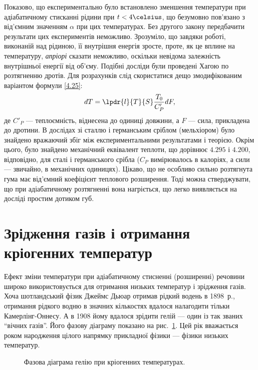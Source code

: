 Показово, що експериментально було встановлено зменшення температури при адіабатичному стисканні
рідини при $t<4\celsius$, що безумовно пов'язано з від'ємним значенням $\alpha$ при цих температурах.
Без другого закону передбачити результати цих експериментів неможливо. Зрозуміло, що завдяки роботі,
виконаній над рідиною, її внутрішня енергія зросте, проте, як це вплине на температуру, \emph{апріорі}
сказати неможливо, оскільки невідома залежність внутрішньої енергії від об'єму. Подібні досліди були
проведені Хагою по розтягненню дротів. Для розрахунків слід скористатися дещо змодифікованим варіантом
формули \eqref{4.25}:
\begin{equation}\label{4.27}
	dT = \lpdr{l}{T}{S}\dfrac{T_0}{C'_P}dF,
\end{equation}
де $C'_P$ --- теплоємність, віднесена до одиниці довжини, а $F$ --- сила, прикладена до дротини. В
дослідах зі сталлю і германським сріблом (мельхіором) було знайдено вражаючий збіг між
експериментальними результатами і теорією. Окрім цього, було знайдено механічний еквівалент теплоти,
що дорівнює $4.295$ і $4.200$, відповідно, для сталі і германського срібла ($C_P$ вимірювалось в
калоріях, а сили --- звичайно, в
механічних
одиницях). Цікаво, що не особливо сильно розтягнута гума має від'ємний коефіцієнт теплового розширення.
Тоді можна стверджувати, що при адіабатичному розтягненні вона нагріється, що легко виявляється на
досліді простим дотиком губ.

\section{Зрідження газів і отримання кріогенних температур}



Ефект зміни температури при адіабатичному стисненні (розширенні) речовини широко використовується для
отримання низьких температур і зрідження газів. Хоча шотландський фізик Джеймс Дьюар отримав рідкий
водень в 1898~р., отримання рідкого водню в значних кількостях вдалося налагодити тільки
Камерлінг-Оннесу. А в 1908 йому вдалося зрідити гелій --- один із так званих \enquote{вічних газів}.
Його фазову діаграму показано на рис.~\ref{tikz:HeLambda}.
Цей рік вважається роком народження цілого напрямку прикладної фізики --- фізики низьких
температур.

\begin{figure}[h!]\centering
	
	\caption{Фазова діаграма гелію при кріогенних температурах.}
	\label{tikz:HeLambda}
\end{figure}



